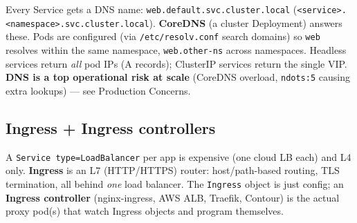 \documentclass[11pt]{article}
\begin{document}
Every Service gets a DNS name: \texttt{web.default.svc.cluster.local} (\texttt{\textless{}service\textgreater{}.\textless{}namespace\textgreater{}.svc.cluster.local}). \textbf{CoreDNS} (a cluster Deployment) answers these. Pods are configured (via \texttt{/etc/resolv.conf} search domains) so \texttt{web} resolves within the same namespace, \texttt{web.other-ns} across namespaces. Headless services return \emph{all} pod IPs (A records); ClusterIP services return the single VIP. \textbf{DNS is a top operational risk at scale} (CoreDNS overload, \texttt{ndots:5} causing extra lookups) --- see Production Concerns.

\subsection{Ingress + Ingress controllers}\label{ingress--ingress-controllers}

A \texttt{Service\ type=LoadBalancer} per app is expensive (one cloud LB each) and L4 only. \textbf{Ingress} is an L7 (HTTP/HTTPS) router: host/path-based routing, TLS termination, all behind \emph{one} load balancer. The \texttt{Ingress} object is just config; an \textbf{Ingress controller} (nginx-ingress, AWS ALB, Traefik, Contour) is the actual proxy pod(s) that watch Ingress objects and program themselves.

\end{document}
